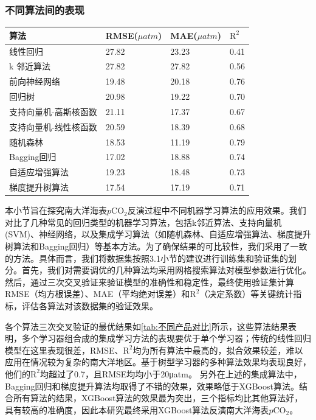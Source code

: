 \subsubsection{不同算法间的表现}
\begin{table}[htbp]
\centering
{}
    \begin{tabularx}{\textwidth}{>{\centering\arraybackslash}X m{2cm} m{2cm} m{2cm}}
    \toprule
    算法  & RMSE($\mu atm$) & MAE($\mu atm$) & $\mathrm{R^2}$  \\ \midrule
    线性回归                    &  27.82  &  23.23  & 0.41  \\
    k 邻近算法                  & 27.82 & 27.82 & 0.56 \\
    前向神经网络                 & 19.48 & 20.18 & 0.76 \\
    回归树                      & 20.98 & 19.22  &0.70   \\
    支持向量机-高斯核函数         & 21.11 & 17.37 & 0.67 \\ 
    支持向量机-线性核函数         & 20.59 & 18.39 & 0.68 \\ 
    随机森林                    & 18.53 & 11.19 & 0.79 \\
    Bagging回归                 & 17.02 &18.88  &0.74\\
    自适应增强算法               &19.23  & 18.48 &0.73 \\
    梯度提升树算法               & 17.54 &17.19 & 0.71 \\
    \bottomrule
    \end{tabularx}
\end{table}

本小节旨在探究南大洋海表$p\mathrm{CO_2}$反演过程中不同机器学习算法的应用效果。我们对比了几种常见的回归类型的机器学习算法，包括k邻近算法、支持向量机(SVM)、神经网络，以及集成学习算法（如随机森林、自适应增强算法、梯度提升树算法和Bagging回归）等基本方法。为了确保结果的可比较性，我们采用了一致的方法。具体而言，我们将数据集按照3.1小节的建议进行训练集和验证集的划分。首先，我们对需要调优的几种算法均采用网格搜索算法对模型参数进行优化。然后，通过三次交叉验证来验证模型的准确性和稳定性，最终使用验证集计算RMSE（均方根误差）、MAE（平均绝对误差）和$\mathrm{R^2}$（决定系数）等关键统计指标，评估各算法对该数据集的验证效果。

各个算法三次交叉验证的最优结果如\autoref{tab:不同产品对比}所示，这些算法结果表明，多个学习器组合成的集成学习方法的表现要优于单个学习器；传统的线性回归模型在这里表现很差，RMSE、$\mathrm{R^2}$均为所有算法中最高的，拟合效果较差，难以应用在情况较为复杂的南大洋地区。基于树型学习器的多种算法效果均表现良好，他们的$\mathrm{R^2}$均超过了0.7，且RMSE均均小于20μatm。
另外在上述的集成算法中，Bagging回归和梯度提升算法均取得了不错的效果，效果略低于XGBoost算法。结合所有算法的结果，XGBoost算法的效果最为突出，三个指标均比其他算法好，具有较高的准确度，因此本研究最终采用XGBoost算法反演南大洋海表$p\mathrm{CO_2}$。

